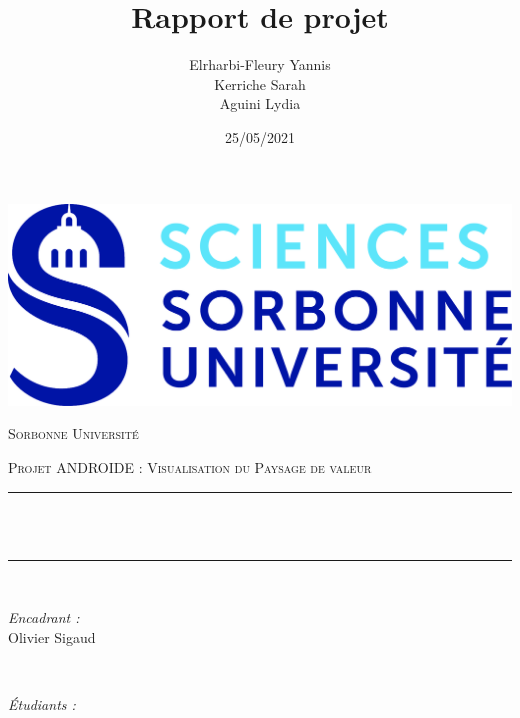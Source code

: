 \documentclass[12pt]{article}
\title{Rapport de projet}
\author{
Elrharbi-Fleury Yannis \\
Kerriche Sarah \\
Aguini Lydia
}
\date{25/05/2021}
\makeatletter
\let\thetitle\@title
\let\theauthor\@author
\makeatother
\begin{document}


\begin{titlepage}
	\centering
    \vspace*{0.5 cm}
   \includegraphics[scale = 0.075]{Images/logo_SU.jpeg}\\[1.0 cm]	%
\begin{center}    \textsc{\Large   Sorbonne Université}\\[2.0 cm]	\end{center}%
	\textsc{\Large Projet ANDROIDE : Visualisation du Paysage de valeur}\\[0.5 cm]				%
	\rule{\linewidth}{0.2 mm} \\[0.4 cm]
	{ \huge \bfseries \thetitle}\\
	\rule{\linewidth}{0.2 mm} \\[1.5 cm]
	
	\begin{minipage}{0.4\textwidth}
		\begin{flushleft} \large
		\emph{Encadrant :}\\
		Olivier Sigaud\\
		\textbf{\Large }
			\end{flushleft}
			\end{minipage}~
			\begin{minipage}{0.4\textwidth}
            
			\begin{flushright} \large
			\emph{Étudiants :}\\
			\theauthor
		\end{flushright}
           
	\end{minipage}\\[2 cm]
	
\end{titlepage}
\end{document}
